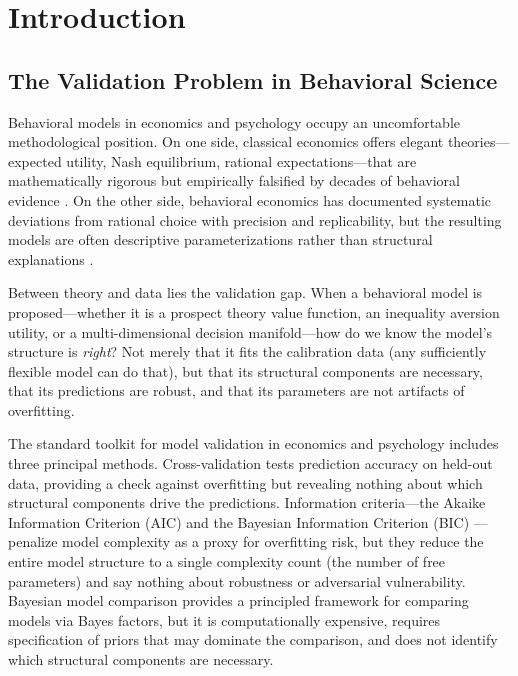 \documentclass[12pt]{article}
\begin{document}
\newpage
\tableofcontents
\newpage


\section{Introduction}
\label{sec:intro}

\subsection{The Validation Problem in Behavioral Science}

Behavioral models in economics and psychology occupy an uncomfortable methodological position.  On one side, classical economics offers elegant theories---expected utility, Nash equilibrium, rational expectations---that are mathematically rigorous but empirically falsified by decades of behavioral evidence \cite{kahneman1979,camerer2003}.  On the other side, behavioral economics has documented systematic deviations from rational choice with precision and replicability, but the resulting models are often descriptive parameterizations rather than structural explanations \cite{fehr1999,engel2011}.

Between theory and data lies the validation gap.  When a behavioral model is proposed---whether it is a prospect theory value function, an inequality aversion utility, or a multi-dimensional decision manifold---how do we know the model's structure is \emph{right}?  Not merely that it fits the calibration data (any sufficiently flexible model can do that), but that its structural components are necessary, that its predictions are robust, and that its parameters are not artifacts of overfitting.

The standard toolkit for model validation in economics and psychology includes three principal methods.  Cross-validation \cite{stone1974,geisser1975} tests prediction accuracy on held-out data, providing a check against overfitting but revealing nothing about which structural components drive the predictions.  Information criteria---the Akaike Information Criterion (AIC) \cite{burnham2002} and the Bayesian Information Criterion (BIC) \cite{schwarz1978}---penalize model complexity as a proxy for overfitting risk, but they reduce the entire model structure to a single complexity count (the number of free parameters) and say nothing about robustness or adversarial vulnerability.  Bayesian model comparison \cite{kass1995} provides a principled framework for comparing models via Bayes factors, but it is computationally expensive, requires specification of priors that may dominate the comparison, and does not identify which structural components are necessary.
\end{document}

